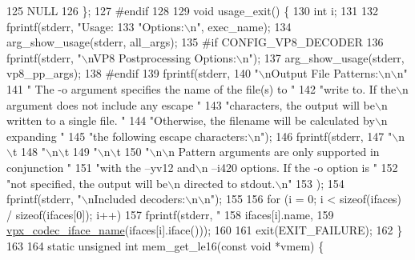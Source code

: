 \begin{DoxyCodeInclude}
125   NULL
126 \};
127 \textcolor{preprocessor}{#endif}
128 
129 \textcolor{keywordtype}{void} usage\_exit() \{
130   \textcolor{keywordtype}{int} i;
131 
132   fprintf(stderr, \textcolor{stringliteral}{"Usage: %
133           \textcolor{stringliteral}{"Options:\(\backslash\)n"}, exec\_name);
134   arg\_show\_usage(stderr, all\_args);
135 \textcolor{preprocessor}{#if CONFIG\_VP8\_DECODER}
136   fprintf(stderr, \textcolor{stringliteral}{"\(\backslash\)nVP8 Postprocessing Options:\(\backslash\)n"});
137   arg\_show\_usage(stderr, vp8\_pp\_args);
138 \textcolor{preprocessor}{#endif}
139   fprintf(stderr,
140           \textcolor{stringliteral}{"\(\backslash\)nOutput File Patterns:\(\backslash\)n\(\backslash\)n"}
141           \textcolor{stringliteral}{"  The -o argument specifies the name of the file(s) to "}
142           \textcolor{stringliteral}{"write to. If the\(\backslash\)n  argument does not include any escape "}
143           \textcolor{stringliteral}{"characters, the output will be\(\backslash\)n  written to a single file. "}
144           \textcolor{stringliteral}{"Otherwise, the filename will be calculated by\(\backslash\)n  expanding "}
145           \textcolor{stringliteral}{"the following escape characters:\(\backslash\)n"});
146   fprintf(stderr,
147           \textcolor{stringliteral}{"\(\backslash\)n\(\backslash\)t%
148           \textcolor{stringliteral}{"\(\backslash\)n\(\backslash\)t%
149           \textcolor{stringliteral}{"\(\backslash\)n\(\backslash\)t%
150           \textcolor{stringliteral}{"\(\backslash\)n\(\backslash\)n  Pattern arguments are only supported in conjunction "}
151           \textcolor{stringliteral}{"with the --yv12 and\(\backslash\)n  --i420 options. If the -o option is "}
152           \textcolor{stringliteral}{"not specified, the output will be\(\backslash\)n  directed to stdout.\(\backslash\)n"}
153          );
154   fprintf(stderr, \textcolor{stringliteral}{"\(\backslash\)nIncluded decoders:\(\backslash\)n\(\backslash\)n"});
155 
156   \textcolor{keywordflow}{for} (i = 0; i < \textcolor{keyword}{sizeof}(ifaces) / \textcolor{keyword}{sizeof}(ifaces[0]); i++)
157     fprintf(stderr, \textcolor{stringliteral}{"    %
158             ifaces[i].name,
159             \hyperlink{group__codec_ga9eee39f450d8cdcf5aba0e2bda6e5aa8}{vpx\_codec\_iface\_name}(ifaces[i].iface()));
160 
161   exit(EXIT\_FAILURE);
162 \}
163 
164 \textcolor{keyword}{static} \textcolor{keywordtype}{unsigned} \textcolor{keywordtype}{int} mem\_get\_le16(\textcolor{keyword}{const} \textcolor{keywordtype}{void} *vmem) \{
}}}}}
\end{DoxyCodeInclude}
